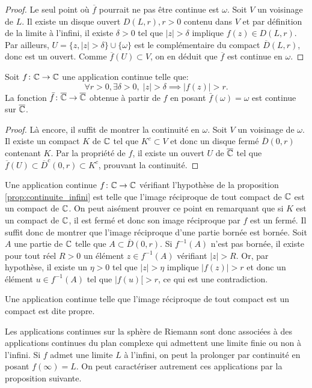 \begin{proof}
Le seul point où $\overline{f}$ pourrait ne pas être continue est $\omega$. Soit $V$ un voisinage de $L$. Il existe un disque ouvert $D(L,r),r>0$ contenu dans $V$ et par définition de la limite à l'infini, il existe $\delta > 0$ tel que $|z| > \delta$ implique $f(z) \in D(L,r)$. Par ailleurs, $U = \{z, |z| > \delta \} \cup \{\omega\}$ est le complémentaire du compact $\overline{D}(L,r)$, donc est un ouvert. Comme $\overline{f}(U) \subset V$, on en déduit que $\overline{f}$ est continue en $\omega$.
\end{proof}
\begin{fprop}
\label{prop:continuite_infini}
Soit $f \colon \mathbb{C} \to \mathbb{C}$ une application continue telle que:
\[\forall r > 0, \exists \delta >0, \;  \lvert z \rvert > \delta \implies \lvert f(z) \rvert > r.\]
La fonction $\bar{f} \colon \overline{\mathbb{C}} \to \overline{\mathbb{C}}$ obtenue à partir de $f$ en posant $\bar{f}(\omega)=\omega$ est continue sur $\overline{\mathbb{C}}$.
\end{fprop}
\begin{proof}
Là encore, il suffit de montrer la continuité en $\omega$. Soit $V$ un voisinage de $\omega$. Il existe un compact $K$ de $\mathbb{C}$ tel que $K^c \subset V$ et donc un disque fermé $\overline{D}(0,r)$ contenant $K$. Par la propriété de $f$, il existe un ouvert $U$ de $\overline{\mathbb{C}}$ tel que $\overline{f}(U) \subset \overline{D}^c(0,r) \subset K^c$, prouvant la continuité. 
\end{proof}
\begin{rem}
Une application continue $f \colon \mathbb{C} \to \mathbb{C}$ vérifiant l'hypothèse de la proposition \ref{prop:continuite_infini} est telle que l'image réciproque de tout compact de $\mathbb{C}$ est un compact de $\mathbb{C}$. On peut aisément prouver ce point en remarquant que si $K$ est un compact de $\mathbb{C}$, il est fermé et donc son image réciproque par $f$ est un fermé. Il suffit donc de montrer que l'image réciproque d'une partie bornée est bornée. Soit $A$ une partie de $\mathbb{C}$ telle que $A \subset \overline{D}(0,r)$. Si $f^{-1}(A)$ n'est pas bornée, il existe pour tout réel $R > 0$ un élément $z \in f^{-1}(A)$ vérifiant $|z| > R$. Or, par hypothèse, il existe un $\eta > 0$ tel que $|z| > \eta$ implique $|f(z)| > r$ et donc un élément $u \in f^{-1}(A)$ tel que $|f(u)[ > r$, ce qui est une contradiction.

Une application continue telle que l'image réciproque de tout compact est un compact est dite propre. 
\end{rem}
Les applications continues sur la sphère de Riemann sont donc associées à des applications continues du plan complexe qui admettent une limite finie ou non à l'infini. Si $f$ admet une limite $L$ à l'infini, on peut la prolonger par continuité en posant $f(\infty)=L$. On peut caractériser autrement ces applications par la proposition suivante.
